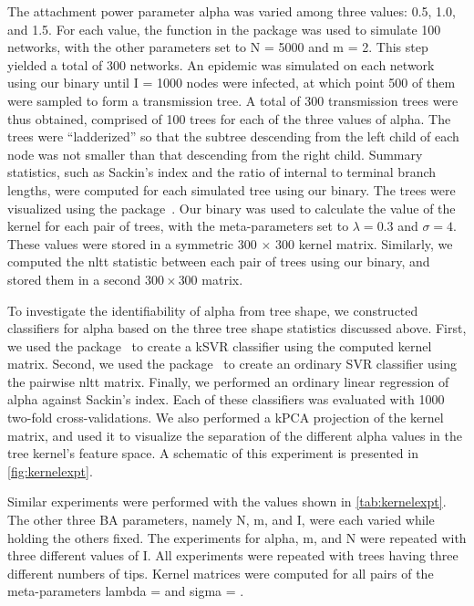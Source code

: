 The attachment power parameter \gls{alpha} was varied among three values: 0.5,
1.0, and 1.5. For each value, the  function in the
 package was used to simulate 100 networks, with the other
parameters set to \gls{N} = 5000 and \gls{m} = 2. This step yielded a total of
300 networks. An epidemic was simulated on each network using our
 binary until \gls{I} = 1000 nodes were infected, at which
point 500 of them were sampled to form a transmission tree. A total of 300
transmission trees were thus obtained, comprised of 100 trees for each of the
three values of \gls{alpha}. The trees were ``ladderized'' so that the subtree
descending from the left child of each node was not smaller than that
descending from the right child. Summary statistics, such as Sackin's index and
the ratio of internal to terminal branch lengths, were computed for each
simulated tree using our  binary. The trees were visualized
using the  package~\autocite{paradis2004ape}. Our
 binary was used to calculate the value of the kernel for
each pair of trees, with the meta-parameters set to $\lambda = 0.3$ and $\sigma
= 4$. These values were stored in a symmetric 300 $\times$ 300 kernel matrix.
Similarly, we computed the \gls{nltt} statistic between each pair of trees
using our  binary, and stored them in a second $300 \times
300$ matrix.

To investigate the identifiability of \gls{alpha} from tree shape, we
constructed classifiers for \gls{alpha} based on the three tree shape
statistics discussed above. First, we used the 
package~\autocite{zeileis2004kernlab} to create a \gls{kSVR} classifier using
the computed kernel matrix. Second, we used the 
package~\autocite{meyer2015e1071} to create an ordinary \gls{SVR} classifier
using the pairwise \gls{nltt} matrix. Finally, we performed an ordinary linear
regression of \gls{alpha} against Sackin's index. Each of these classifiers was
evaluated with 1000 two-fold cross-validations. We also performed a \gls{kPCA}
projection of the kernel matrix, and used it to visualize the separation of the
different \gls{alpha} values in the tree kernel's feature space. A schematic of
this experiment is presented in \cref{fig:kernelexpt}.

Similar experiments were performed with the values shown in
\cref{tab:kernelexpt}. The other three \gls{BA} parameters, namely \gls{N},
\gls{m}, and \gls{I}, were each varied while holding the others fixed. The
experiments for \gls{alpha}, \gls{m}, and \gls{N} were repeated with three
different values of \gls{I}. All experiments were repeated with trees having
three different numbers of tips. Kernel matrices were computed for all pairs of
the meta-parameters \gls{lambda} =  and \gls{sigma} =
.

